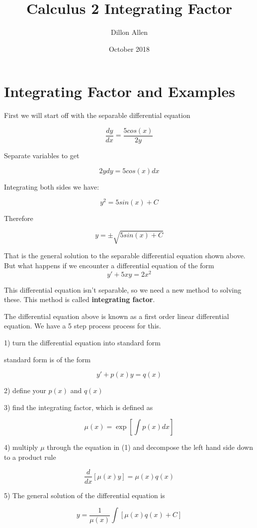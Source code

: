\documentclass{article}
\title{Calculus 2 Integrating Factor}
\author{Dillon Allen }
\date{October 2018}
\begin{document}
\maketitle

\section{Integrating Factor and Examples}
First we will start off with the separable differential equation

$$ \frac{dy}{dx} = \frac{5 cos\left(x\right)}{2y}$$

Separate variables to get 

$$ 2y dy = 5 cos\left(x \right) dx$$

Integrating both sides we have:

$$ y^2 = 5 sin  \left( x \right) + C $$

Therefore

$$ y = \pm \sqrt{ 5 sin \left( x \right) + C } $$

That is the general solution to the separable differential equation shown above. But what happens if we encounter a differential equation of the form 
$$ y' + 5xy = 2 x^2$$

This differential equation isn't separable, so we need a new method to solving these. This method is called \textbf{integrating factor}. 

The differential equation above is known as a first order linear differential equation. We have a 5 step process process for this.

1) turn the differential equation into standard form

standard form is of the form

$$ y' + p\left(x\right)y = q\left(x\right) $$

2) define your $p\left(x\right)$ and $q\left(x\right)$

3) find the integrating factor, which is defined as

$$ \mu\left(x\right) = \exp\left[\int p\left(x\right)dx\right]$$


4) multiply $\mu$ through the equation in (1) and decompose the left hand side down to a product rule

$$ \frac{d}{dx}\left[\mu\left(x\right)y\right] = \mu\left(x\right)q\left(x\right) $$

5) The general solution of the differential equation is

$$ y = \frac{1}{\mu\left(x\right)}\int \left[ \mu\left(x\right)q\left(x\right) + C\right]$$
\end{document}
